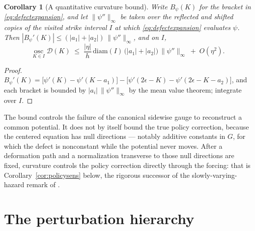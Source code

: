 \documentclass[11pt]{article}
\newtheorem{corollary}{Corollary}
\begin{document}
\begin{corollary}[A quantitative curvature bound]\label{cor:oscbound}
Write $B_\psi(K)$ for the bracket in \eqref{eq:defectexpansion}, and let $\|\psi''\|_\infty$ be taken over the reflected and shifted copies of the visited strike interval $I$ at which \eqref{eq:defectexpansion} evaluates $\psi$. Then $|B_\psi'(K)| \le (|a_1| + |a_2|)\,\|\psi''\|_\infty$, and on $I$,
\[
\operatorname*{osc}_{K \in I} \mathcal D(K) \;\le\; \frac{|\eta|}{h}\,\mathrm{diam}(I)\,\big(|a_1| + |a_2|\big)\,\|\psi''\|_\infty \;+\; O(\eta^2).
\]
\end{corollary}

\begin{proof}
$B_\psi'(K) = \big[\psi'(K) - \psi'(K - a_1)\big] - \big[\psi'(2\epsilon - K) - \psi'(2\epsilon - K - a_2)\big]$, and each bracket is bounded by $|a_i|\,\|\psi''\|_\infty$ by the mean value theorem; integrate over $I$.
\end{proof}

The bound controls the failure of the canonical sidewise gauge to reconstruct a common potential. It does not by itself bound the true policy correction, because the centered equation has null directions --- notably additive constants in $G$, for which the defect is nonconstant while the potential never moves. After a deformation path and a normalization transverse to those null directions are fixed, curvature controls the policy correction directly through the forcing: that is Corollary~\ref{cor:policysens} below, the rigorous successor of the slowly-varying-hazard remark of \citet{cotton2026skew}.


\section{The perturbation hierarchy}\label{sec:hierarchy}
\end{document}
